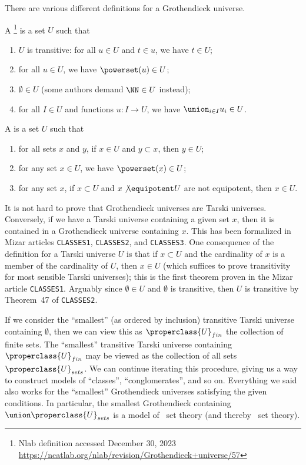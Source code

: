 \begin{node}\label{tg-0001}%
There are various different definitions for a Grothendieck universe.
\begin{definition}\label{set:tg-0000}%
A \footnote{Nlab definition accessed
December 30, 2023 \url{https://ncatlab.org/nlab/revision/Grothendieck+universe/57}} is a set $U$ such that
\begin{enumerate}
\item $U$ is transitive: for all $u\in U$ and $t\in u$, we have $t\in U$;
\item for all $u\in U$, we have $\powerset(u)\in U$;
\item $\emptyset\in U$ (some authors demand $\NN\in U$ instead);
\item for all $I\in U$ and functions $u\colon I\to U$, we have
  $\union_{i\in I}u_{i}\in U$.
\end{enumerate}
\end{definition}
\begin{definition}
A  is a set $U$ such that
\begin{enumerate}
\item for all sets $x$ and $y$, if $x\in U$ and $y\subset x$, then $y\in U$;
\item for any set $x\in U$, we have $\powerset(x)\in U$;
\item for any set $x$, if $x\subset U$ and $x\not\equipotent U$ are not equipotent, then $x\in U$.
\end{enumerate}
\begin{node}[Remarks]\label{tg-0002}%
It is not hard to prove that Grothendieck universes are Tarski
universes.  Conversely, if we have a Tarski universe containing a given
set $x$, then it is contained in a Grothendieck universe containing
$x$. This has been formalized in Mizar articles \texttt{CLASSES1},
\texttt{CLASSES2}, and \texttt{CLASSES3}. One consequence of the
definition for a Tarski universe $U$ is that if $x\subset U$ and the
cardinality of $x$ is a member of the cardinality of $U$, then $x\in U$
(which suffices to prove transitivity for most sensible Tarski
universes); this is the first theorem proven in the Mizar article
\texttt{CLASSES1}. Arguably since $\emptyset\in U$ and $\emptyset$ is
transitive, then $U$ is transitive by Theorem~47 of \texttt{CLASSES2}.

If we consider the ``smallest'' (as ordered by inclusion) transitive
Tarski universe containing $\emptyset$, then we can view this as
$\properclass{U}_{fin}$ the collection of finite sets. The ``smallest''
transitive Tarski universe containing $\properclass{U}_{fin}$ may be
viewed as the collection of all sets $\properclass{U}_{sets}$. We can
continue iterating this procedure, giving us a way to construct
models of ``classes'', ``conglomerates'', and so on. Everything we said
also works for the ``smallest'' Grothendieck universes satisfying the
given conditions. In particular, the smallest Grothendieck containing $\union\properclass{U}_{sets}$
is a model of \MK\ set theory (and thereby \NBG\ set theory).


\end{node}
\end{definition}
\end{node}

